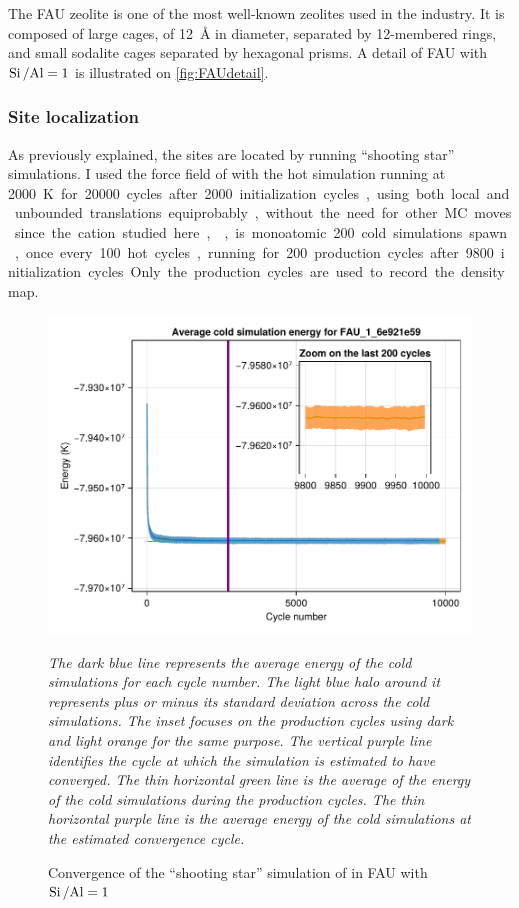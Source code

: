 \documentclass[main.tex]{subfiles}
\begin{document}
The FAU zeolite is one of the most well-known zeolites used in the industry. It is composed of large cages, of \qty{12}{\angstrom} in diameter, separated by 12-membered rings, and small sodalite cages separated by hexagonal prisms. A detail of FAU with $\mbox{Si\,/Al} = 1$ is illustrated on \cref{fig:FAUdetail}.

\subsubsection{Site localization}
\label{sitelocalization}

As previously explained, the sites are located by running ``shooting star'' simulations. I used the force field of \textcite{BoulfelfelSholl2021} with the hot simulation running at \qty{2000}K for \num{20000} cycles after \num{2000} initialization cycles, using both local and unbounded translations equiprobably, without the need for other MC moves since the cation studied here, , is monoatomic. \num{200} cold simulations spawn, once every \num{100} hot cycles, running for \num{200} production cycles after \num{9800} initialization cycles. Only the production cycles are used to record the density map.

\begin{figure}
	{\centering
		\includegraphics[width=\columnwidth]{figures/cations/convergenceFAUshootingstar.pdf}
		\caption{Convergence of the ``shooting star'' simulation of  in FAU with $\mbox{Si\,/Al} = 1$\\}\label{fig:convergenceFAUshootingstar}
		
		\sl The dark blue line represents the average energy of the cold simulations for each cycle number. The light blue halo around it represents plus or minus its standard deviation across the cold simulations. The inset focuses on the production cycles using dark and light orange for the same purpose. The vertical purple line identifies the cycle at which the simulation is estimated to have converged. The thin horizontal green line is the average of the energy of the cold simulations during the production cycles. The thin horizontal purple line is the average energy of the cold simulations at the estimated convergence cycle.}
\end{figure}
\end{document}
